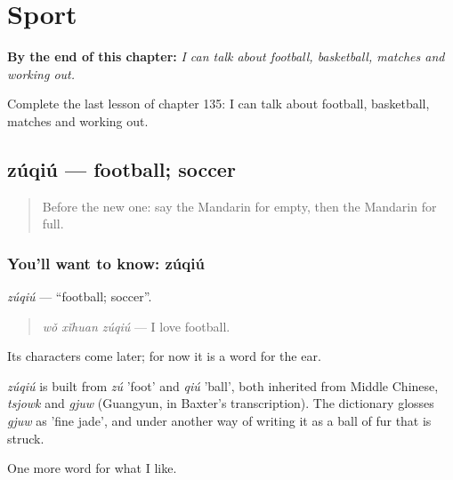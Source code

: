 
\chapter{Sport}
\label{ch:zh-sport}

\begin{chapteropening}
\textbf{By the end of this chapter:} \emph{I can talk about football, basketball, matches and working out.}

Complete the last lesson of chapter 135: I can talk about football, basketball, matches and working out.
\end{chapteropening}

\section[zúqiú]{zúqiú — football; soccer}

\label{lesson:ZH-C135-zuqiu}



\begin{quote}
Before the new one: say the Mandarin for empty, then the Mandarin for full.
\end{quote}

\subsection*{You'll want to know: zúqiú}
\emph{zúqiú} — \textquotedblleft{}football; soccer\textquotedblright{}.

\begin{quote}
\emph{wǒ xǐhuan zúqiú} — I love football.
\end{quote}

Its characters come later; for now it is a word for the ear.

\begin{cousinweb}
\emph{zúqiú} is built from \emph{zú} 'foot' and \emph{qiú} 'ball', both inherited from Middle Chinese, \emph{tsjowk} and \emph{gjuw} (Guangyun, in Baxter's transcription). The dictionary glosses \emph{gjuw} as 'fine jade', and under another way of writing it as a ball of fur that is struck.
\end{cousinweb}

\begin{grammarlens}[title={What you've built}]
One more word for what I like.
\end{grammarlens}

